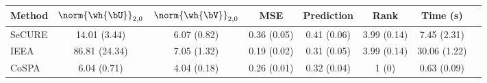 \begin{tabular}{lccccccc} 
\toprule 
Method & $\norm{\wh{\bU}}_{2,0}$ & $\norm{\wh{\bV}}_{2,0}$ & MSE & Prediction & Rank & Time (s) \\ 
\midrule 
 SeCURE & 14.01 (3.44) & 6.07 (0.82) & 0.36 (0.05) & 0.41 (0.06) & 3.99 (0.14) & 7.45 (2.31) \\ 
IEEA & 86.81 (24.34) & 7.05 (1.32) & 0.19 (0.02) & 0.31 (0.05) & 3.99 (0.14) & 30.06 (1.22) \\ 
CoSPA & 6.04 (0.71) & 4.04 (0.18) & 0.26 (0.01) & 0.32 (0.04) & 1 (0) & 0.63 (0.09) \\ 
\bottomrule 
\end{tabular} 
